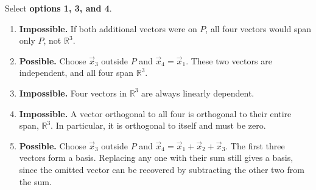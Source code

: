 \documentclass[11pt,twoside]{article}
\begin{document}
\begin{prob}[(19 pts)]
\begin{subprob}
\begin{solution}
Select \textbf{options 1, 3, and 4}.
\begin{enumerate}
\item \textbf{Impossible.} If both additional vectors were on $P$, all four vectors would span only $P$, not $\mathbb R^3$.
\item \textbf{Possible.} Choose $\vec x_3$ outside $P$ and $\vec x_4=\vec x_1$. These two vectors are independent, and all four span $\mathbb R^3$.
\item \textbf{Impossible.} Four vectors in $\mathbb R^3$ are always linearly dependent.
\item \textbf{Impossible.} A vector orthogonal to all four is orthogonal to their entire span, $\mathbb R^3$. In particular, it is orthogonal to itself and must be zero.
\item \textbf{Possible.} Choose $\vec x_3$ outside $P$ and $\vec x_4=\vec x_1+\vec x_2+\vec x_3$. The first three vectors form a basis. Replacing any one with their sum still gives a basis, since the omitted vector can be recovered by subtracting the other two from the sum.
\end{enumerate}
\end{solution}
\end{subprob}
\end{prob}\clearpage
\end{document}
